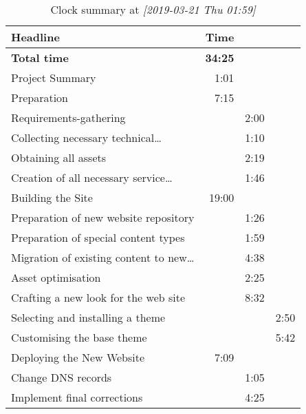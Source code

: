 \documentclass{article}
\begin{document}
\begin{table}[htbp]
\caption{Clock summary at \textit{[2019-03-21 Thu 01:59]}}
\centering
\begin{tabular}{lrrl}
Headline & Time &  & \\
\hline
\textbf{Total time} & \textbf{34:25} &  & \\
\hline
Project Summary & 1:01 &  & \\
Preparation & 7:15 &  & \\
\hspace*{1.0em}Requirements-gathering &  & 2:00 & \\
\hspace*{1.0em}Collecting necessary technical\ldots{} &  & 1:10 & \\
\hspace*{1.0em}Obtaining all assets &  & 2:19 & \\
\hspace*{1.0em}Creation of all necessary service\ldots{} &  & 1:46 & \\
Building the Site & 19:00 &  & \\
\hspace*{1.0em}Preparation of new website repository &  & 1:26 & \\
\hspace*{1.0em}Preparation of special content types &  & 1:59 & \\
\hspace*{1.0em}Migration of existing content to new\ldots{} &  & 4:38 & \\
\hspace*{1.0em}Asset optimisation &  & 2:25 & \\
\hspace*{1.0em}Crafting a new look for the web site &  & 8:32 & \\
\hspace*{2.0em}Selecting and installing a theme &  &  & 2:50\\
\hspace*{2.0em}Customising the base theme &  &  & 5:42\\
Deploying the New Website & 7:09 &  & \\
\hspace*{1.0em}Change DNS records &  & 1:05 & \\
\hspace*{1.0em}Implement final corrections &  & 4:25 & \\
\end{tabular}
\end{table}
\end{document}
